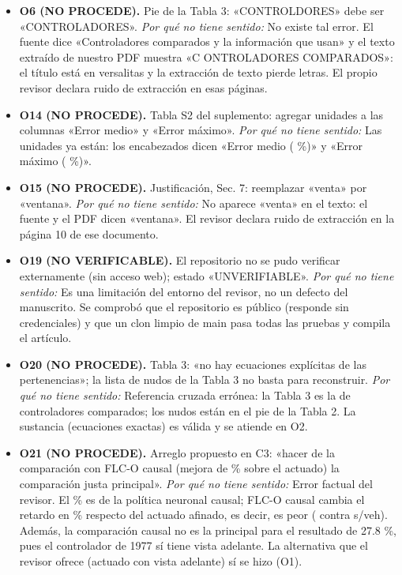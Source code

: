 \begin{itemize}
\item \textbf{O6 (NO PROCEDE).} Pie de la Tabla 3: «CONTROLDORES» debe ser «CONTROLADORES». \emph{Por qu\'e no tiene sentido:} No existe tal error. El fuente dice «Controladores comparados y la información que usan» y el texto extraído de nuestro PDF muestra «C ONTROLADORES COMPARADOS»: el título está en versalitas y la extracción de texto pierde letras. El propio revisor declara ruido de extracción en esas páginas.
\item \textbf{O14 (NO PROCEDE).} Tabla S2 del suplemento: agregar unidades a las columnas «Error medio» y «Error máximo». \emph{Por qu\'e no tiene sentido:} Las unidades ya están: los encabezados dicen «Error medio ( \%)» y «Error máximo ( \%)».
\item \textbf{O15 (NO PROCEDE).} Justificación, Sec. 7: reemplazar «venta» por «ventana». \emph{Por qu\'e no tiene sentido:} No aparece «venta» en el texto: el fuente y el PDF dicen «ventana». El revisor declara ruido de extracción en la página 10 de ese documento.
\item \textbf{O19 (NO VERIFICABLE).} El repositorio no se pudo verificar externamente (sin acceso web); estado «UNVERIFIABLE». \emph{Por qu\'e no tiene sentido:} Es una limitación del entorno del revisor, no un defecto del manuscrito. Se comprobó que el repositorio es público (responde sin credenciales) y que un clon limpio de main pasa todas las pruebas y compila el artículo.
\item \textbf{O20 (NO PROCEDE).} Tabla 3: «no hay ecuaciones explícitas de las pertenencias»; la lista de nudos de la Tabla 3 no basta para reconstruir. \emph{Por qu\'e no tiene sentido:} Referencia cruzada errónea: la Tabla 3 es la de controladores comparados; los nudos están en el pie de la Tabla 2. La sustancia (ecuaciones exactas) es válida y se atiende en O2.
\item \textbf{O21 (NO PROCEDE).} Arreglo propuesto en C3: «hacer de la comparación con FLC-O causal (mejora de \RedActMlpC{} \% sobre el actuado) la comparación justa principal». \emph{Por qu\'e no tiene sentido:} Error factual del revisor. El \RedActMlpC{} \% es de la política neuronal causal; FLC-O causal cambia el retardo en \RedActFlcC{} \% respecto del actuado afinado, es decir, es peor (\DelayOfFlcC{} contra \DelayOfActAf{} s/veh). Además, la comparación causal no es la principal para el resultado de 27.8 \%, pues el controlador de 1977 sí tiene vista adelante. La alternativa que el revisor ofrece (actuado con vista adelante) sí se hizo (O1).
\end{itemize}
